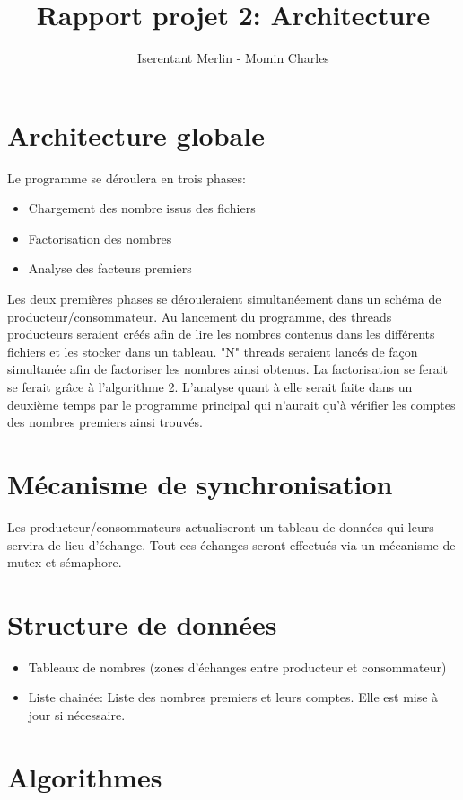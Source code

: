 \documentclass[11pt,a4paper]{article}
\begin{document}
\author{Iserentant Merlin - Momin Charles}
\title{Rapport projet 2: Architecture}
\maketitle

\section{Architecture globale}
Le programme se déroulera en trois phases:

\begin{itemize}
\item{Chargement des nombre issus des fichiers}
\item{Factorisation des nombres}
\item{Analyse des facteurs premiers}
\end{itemize}

Les deux premières phases se dérouleraient simultanéement dans un schéma de producteur/consommateur. Au lancement du programme, des threads producteurs seraient créés afin de lire les nombres contenus dans les différents fichiers et les stocker dans un tableau. "N" threads seraient lancés de façon simultanée afin de factoriser les nombres ainsi obtenus. La factorisation se ferait se ferait grâce à l'algorithme 2. L'analyse quant à elle serait faite dans un deuxième temps par le programme principal qui n'aurait qu'à vérifier les comptes des nombres premiers ainsi trouvés. 

\section{Mécanisme de synchronisation}
Les producteur/consommateurs actualiseront un tableau de données qui leurs servira de lieu d'échange. Tout ces échanges seront effectués via un mécanisme de mutex et sémaphore.

\section{Structure de données}
\begin{itemize}
\item{Tableaux de nombres (zones d'échanges entre producteur et consommateur)}
\item{Liste chainée: Liste des nombres premiers et leurs comptes. Elle est mise à jour si nécessaire.}
\end{itemize}

\section{Algorithmes}
\end{document}
